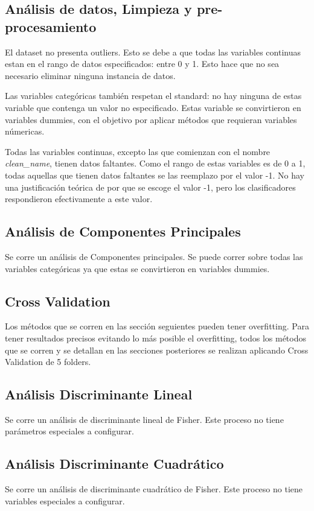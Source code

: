 \documentclass[journal]{IEEEtran}
\begin{document}
\subsection{Análisis de datos, Limpieza y pre-procesamiento}
El dataset no presenta outliers. Esto se debe a que todas las variables continuas estan
en el rango de datos especificados: entre 0 y 1. 
Esto hace que no sea necesario eliminar ninguna
instancia de datos.

Las variables categóricas también respetan el standard: no hay ninguna
de estas variable que contenga un valor no especificado. Estas 
variable se convirtieron en variables dummies, con el objetivo 
por aplicar métodos que requieran variables númericas.

Todas las variables continuas, excepto las que comienzan con el
nombre \textit{clean\_name}, tienen datos faltantes. Como el rango
de estas variables es de 0 a 1, todas aquellas que tienen datos
faltantes se las reemplazo por el valor -1. No hay una justificación
teórica de por que se escoge el valor -1, pero los clasificadores
respondieron efectivamente a este valor.

\subsection{Análisis de Componentes Principales}
Se corre un análisis de Componentes principales. Se puede correr sobre
todas las variables categóricas ya que estas se convirtieron en 
variables dummies.

\subsection{Cross Validation}
Los métodos que se corren en las sección seguientes pueden tener overfitting. Para
tener resultados precisos evitando lo más posible el overfitting, todos los
métodos que se corren y se detallan en las secciones posteriores se realizan
aplicando Cross Validation de 5 folders.

\subsection{Análisis Discriminante Lineal}
Se corre un análisis de discriminante lineal de Fisher. Este proceso no 
tiene parámetros especiales a configurar.

\subsection{Análisis Discriminante Cuadrático}
Se corre un análisis de discriminante cuadrático de Fisher. Este proceso
no tiene variables especiales a configurar.
\end{document}
